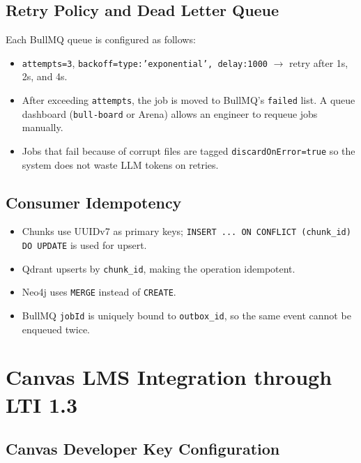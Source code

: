 \subsection{Retry Policy and Dead Letter Queue}

Each BullMQ queue is configured as follows:

\begin{itemize}
    \item \texttt{attempts=3}, \texttt{backoff={type:'exponential',
          delay:1000}} $\to$ retry after 1s, 2s, and 4s.
    \item After exceeding \texttt{attempts}, the job is moved to
          BullMQ's \texttt{failed} list. A queue dashboard
          (\texttt{bull-board} or Arena) allows an engineer to requeue
          jobs manually.
    \item Jobs that fail because of corrupt files are tagged
          \texttt{discardOnError=true} so the system does not waste LLM
          tokens on retries.
\end{itemize}

\subsection{Consumer Idempotency}

\begin{itemize}
    \item Chunks use UUIDv7 as primary keys; \texttt{INSERT ... ON
          CONFLICT (chunk\_id) DO UPDATE} is used for upsert.
    \item Qdrant upserts by \texttt{chunk\_id}, making the operation
          idempotent.
    \item Neo4j uses \texttt{MERGE} instead of \texttt{CREATE}.
    \item BullMQ \texttt{jobId} is uniquely bound to
          \texttt{outbox\_id}, so the same event cannot be enqueued
          twice.
\end{itemize}

\section{Canvas LMS Integration through LTI 1.3}
\label{sec:lti-impl}

\subsection{Canvas Developer Key Configuration}

